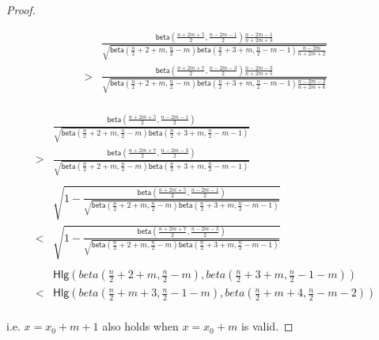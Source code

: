 \documentclass{article}
\begin{document}
\begin{proof}
\begin{footnotesize}
\begin{equation*}
\begin{split}
& \frac{\mathsf{beta}(\frac{n + 2m + 5}{2}, \frac{n - 2m - 1}{2})
\frac{n - 2m - 1}{n + 2m + 3}}
{\sqrt{
\mathsf{beta}(\frac{n}{2} + 2 + m, \frac{n}{2} - m)
\mathsf{beta}(\frac{n}{2} + 3 + m, \frac{n}{2} - m - 1)
\frac{n - 2m}{n + 2m + 2}
}
}\\
> & \frac{\mathsf{beta}(\frac{n + 2m + 7}{2}, \frac{n - 2m - 3}{2})
\frac{n - 2m - 3}{n + 2m + 5}}
{\sqrt{
\mathsf{beta}(\frac{n}{2} + 2 + m, \frac{n}{2} - m)
\mathsf{beta}(\frac{n}{2} + 3 + m, \frac{n}{2} - m - 1)
\frac{n - 2m - 2}{n + 2m + 6}
}
}\\
\end{split}
\end{equation*}

\begin{equation*}
\begin{split}
& \frac{\mathsf{beta}(\frac{n + 2m + 5}{2}, \frac{n - 2m - 1}{2})}
{\sqrt{
\mathsf{beta}(\frac{n}{2} + 2 + m, \frac{n}{2} - m)
\mathsf{beta}(\frac{n}{2} + 3 + m, \frac{n}{2} - m - 1)
}
}\\
> & \frac{\mathsf{beta}(\frac{n + 2m + 7}{2}, \frac{n - 2m - 3}{2})}
{\sqrt{
\mathsf{beta}(\frac{n}{2} + 2 + m, \frac{n}{2} - m)
\mathsf{beta}(\frac{n}{2} + 3 + m, \frac{n}{2} - m - 1)
}
}\\
\\
& \sqrt{1 - \frac{\mathsf{beta}(\frac{n + 2m + 5}{2}, \frac{n - 2m - 1}{2})}
{\sqrt{
\mathsf{beta}(\frac{n}{2} + 2 + m, \frac{n}{2} - m)
\mathsf{beta}(\frac{n}{2} + 3 + m, \frac{n}{2} - m - 1)
}
}}\\
< & \sqrt{1 - \frac{\mathsf{beta}(\frac{n + 2m + 7}{2}, \frac{n - 2m - 3}{2})}
{\sqrt{
\mathsf{beta}(\frac{n}{2} + 2 + m, \frac{n}{2} - m)
\mathsf{beta}(\frac{n}{2} + 3 + m, \frac{n}{2} - m - 1)
}
}}\\
\\
& \mathsf{Hlg}(beta(\frac{n}{2} + 2 + m, \frac{n}{2} - m), beta(\frac{n}{2} + 3 + m, \frac{n}{2} - 1 - m))\\
< & \mathsf{Hlg}(beta(\frac{n}{2} + m + 3, \frac{n}{2} - 1 - m), beta(\frac{n}{2} + m + 4, \frac{n}{2} - m - 2))\\
\end{split}
\end{equation*}
\end{footnotesize}

i.e. $ x = x_0 + m + 1$ also holds when $x = x_0 + m$ is valid.
\end{proof}
\end{document}
